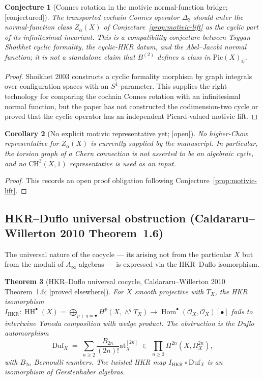 \documentclass[11pt,reqno]{amsart}
\theoremstyle{plain}
\newtheorem{theorem}{Theorem}[section]
\newtheorem{corollary}[theorem]{Corollary}
\newtheorem{conjecture}[theorem]{Conjecture}
\theoremstyle{definition}
\theoremstyle{remark}
\providecommand{\ClaimStatusProvedElsewhere}{\textnormal{[proved elsewhere]}}
\providecommand{\ClaimStatusConjectured}{\textnormal{[conjectured]}}
\providecommand{\ClaimStatusOpen}{\textnormal{[open]}}
\DeclareMathOperator{\Hom}{Hom}
\DeclareMathOperator{\HH}{HH}
\newcommand{\Qbb}{\mathbb{Q}}
\newcommand{\cO}{\mathcal{O}}
\newcommand{\at}{\mathrm{at}}
\begin{document}
\begin{conjecture}[Connes rotation in the motivic normal-function bridge; \ClaimStatusConjectured]
\label{thm:connes-motivic}
The transported cochain Connes operator $\Delta_2$ should enter the
normal-function class $Z_\alpha(X)$ of Conjecture~\ref{prop:motivic-lift}
as the cyclic part of its infinitesimal invariant. This is a
compatibility conjecture between Tsygan--Shoikhet cyclic formality,
the cyclic-HKR datum, and the Abel--Jacobi normal function; it is not a
standalone claim that $B^{(2)}$ defines a class in
$\mathrm{Pic}(X)_{\Qbb}$.
\end{conjecture}

\begin{proof}
Shoikhet 2003 constructs a cyclic formality morphism by graph integrals
over configuration spaces with an $S^1$-parameter. This supplies the
right technology for comparing the cochain Connes rotation with an
infinitesimal normal function, but the paper has not constructed the
codimension-two cycle or proved that the cyclic operator has an
independent Picard-valued motivic lift.
\end{proof}

\begin{corollary}[No explicit motivic representative yet; \ClaimStatusOpen]
\label{cor:motivic-rep}
No higher-Chow representative for $Z_\alpha(X)$ is currently supplied
by the manuscript. In particular, the torsion graph of a Chern
connection is not asserted to be an algebraic cycle, and no
$\mathrm{CH}^3(X,1)$ representative is used as an input.
\end{corollary}

\begin{proof}
This records an open proof obligation following
Conjecture~\ref{prop:motivic-lift}.
\end{proof}

\subsection{HKR--Duflo universal obstruction (Caldararu--Willerton 2010 Theorem~1.6)}
\label{sub:HKR-duflo}
The universal nature of the cocycle --- its arising not from the particular $X$ but from the moduli of $A_\infty$-algebras --- is expressed via the HKR--Duflo isomorphism.

\begin{theorem}[HKR--Duflo universal cocycle, Caldararu--Willerton 2010 Theorem~1.6; \ClaimStatusProvedElsewhere]
\label{thm:hkr-duflo}
For $X$ smooth projective with $T_X$, the HKR isomorphism $I_{\mathrm{HKR}}: \HH^\bullet(X) = \bigoplus_{p+q=\bullet} H^p(X, \wedge^q T_X) \to \Hom^\bullet(\cO_X, \cO_X)[\bullet]$ fails to intertwine Yoneda composition with wedge product. The obstruction is the Duflo automorphism
\[
  \mathrm{Duf}_X \;=\; \sum_{n \geq 2} \frac{B_{2n}}{(2n)!} \at_X^{[2n]} \;\in\; \prod_{n \geq 2} H^{2n}(X, \Omega^{2n}_X),
\]
with $B_{2n}$ Bernoulli numbers. The twisted HKR map $I_{\mathrm{HKR}} \circ \mathrm{Duf}_X$ is an isomorphism of Gerstenhaber algebras.
\end{theorem}
\end{document}
